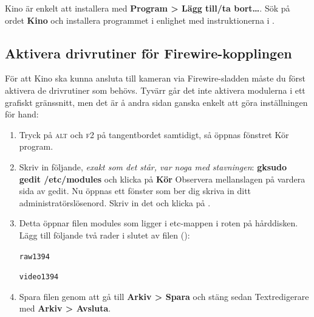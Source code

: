 \documentclass[a4paper,final]{memoir} %
\begin{document}

Kino är enkelt att installera med \textbf{Program \textgreater{} Lägg till/ta bort\ldots{}}. Sök på ordet \textbf{Kino} och installera programmet i enlighet med instruktionerna i .


\subsection{Aktivera drivrutiner för Firewire-kopplingen}


För att Kino ska kunna ansluta till kameran via Firewire-sladden måste du först aktivera de drivrutiner som behövs. Tyvärr går det inte aktivera modulerna i ett grafiskt gränssnitt, men det är å andra sidan ganska enkelt att göra inställningen för hand:

\begin{enumerate}

\item Tryck på \textsc{alt} och \textsc{f2} på tangentbordet samtidigt, så öppnas fönstret Kör program. 

\item Skriv in följande, \textit{exakt som det står, var noga med stavningen}: \textbf{gksudo gedit /etc/modules} och klicka på \textbf{Kör} Observera mellanslagen på vardera sida av gedit. Nu öppnas ett fönster som ber dig skriva in ditt administratörslösenord. Skriv in det och klicka på \xok{}.

\item Detta öppnar filen modules som ligger i etc-mappen i roten på hårddisken. Lägg till följande två rader i slutet av filen ():

\texttt{raw1394}

\texttt{video1394}


\item Spara filen genom att gå till \textbf{Arkiv \textgreater{} Spara} och stäng sedan Textredigerare med \textbf{Arkiv \textgreater{} Avsluta}.

\end{enumerate}
\end{document}
